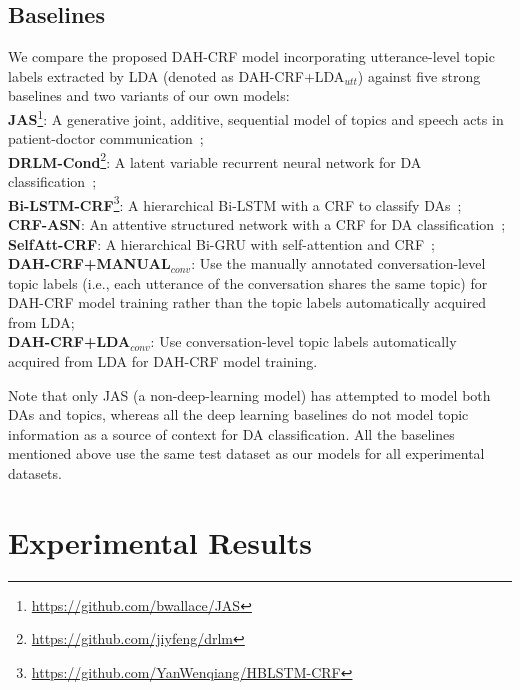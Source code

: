 \documentclass[11pt,a4paper]{article}
\begin{document}
\subsection{Baselines}
We compare the proposed DAH-CRF model incorporating utterance-level topic labels extracted by LDA (denoted as DAH-CRF+LDA$_{utt}$) against five strong baselines and two variants of our own models:\\
\textbf{JAS}\footnote{\url{https://github.com/bwallace/JAS}}: A generative joint, additive, sequential model of topics and speech acts in patient-doctor communication~\cite{wallace2013generative};\\
\textbf{DRLM-Cond}\footnote{\url{https://github.com/jiyfeng/drlm}}: A latent variable recurrent neural network for DA classification~\cite{ji2016latent};\\
\textbf{Bi-LSTM-CRF}\footnote{\url{https://github.com/YanWenqiang/HBLSTM-CRF}}: A hierarchical Bi-LSTM with a CRF 
to classify DAs~\cite{kumar2017dialogue};\\
\textbf{CRF-ASN}: An attentive structured network with a CRF for DA classification~\cite{chen2018dialogue};\\
\textbf{SelfAtt-CRF}: A hierarchical Bi-GRU with self-attention and CRF~\cite{raheja2019dialogue};\\
\textbf{DAH-CRF+MANUAL$_{conv}$}: Use the manually annotated conversation-level topic labels (i.e., each utterance of the conversation shares the same topic) for DAH-CRF model training rather than the topic labels automatically acquired from LDA;\\
\textbf{DAH-CRF+LDA$_{conv}$}: Use conversation-level topic labels automatically acquired from LDA for DAH-CRF model training.

Note that only JAS (a non-deep-learning model) has attempted to model both DAs and topics, whereas all the deep learning baselines do not model topic information as a source of context for DA classification. All the baselines mentioned above use the same test dataset as our models for all experimental datasets.



\section{Experimental Results}
\end{document}
